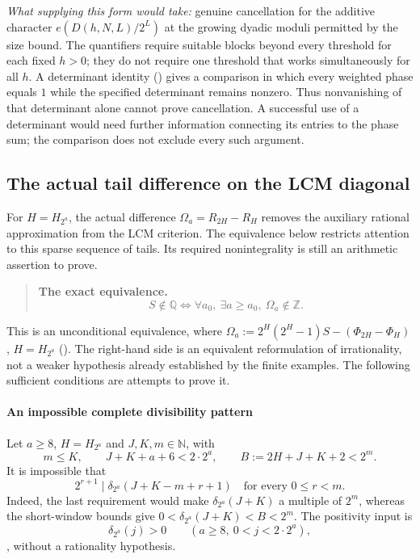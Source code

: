 \emph{What supplying this form would take:} genuine
cancellation for the additive character $e(D(h,N,L)/2^L)$ at the
growing dyadic moduli permitted by the size bound. The quantifiers require
suitable blocks beyond every threshold for each fixed $h>0$; they do not
require one threshold that works simultaneously for all $h$. A determinant
identity
()
gives a comparison in which every weighted phase equals $1$ while the
specified determinant remains nonzero. Thus nonvanishing of that determinant
alone cannot prove cancellation. A successful use of a determinant would
need further information connecting its entries to the phase sum; the
comparison does not exclude every such argument.

\subsection{The actual tail difference on the LCM diagonal}

For $H=H_{2^a}$, the actual difference
$\Omega_a=R_{2H}-R_H$ removes the auxiliary rational approximation
from the LCM criterion. The equivalence below restricts attention to
this sparse sequence of tails. Its required nonintegrality is still
an arithmetic assertion to prove.

\begin{quote}
\textbf{The exact equivalence.}
\[
  S\notin\mathbb Q
  \iff
  \forall a_0,\ \exists a\ge a_0,\ \Omega_a\notin\mathbb{Z}.
\]
\end{quote}
This is an unconditional equivalence, where
$\Omega_a := 2^H(2^H-1)S - (\Phi_{2H}-\Phi_H)$,
$H=H_{2^a}$
().
The right-hand side is an equivalent reformulation of irrationality,
not a weaker hypothesis already established by the finite examples.
The following sufficient conditions are attempts to prove it.


\paragraph{An impossible complete divisibility pattern}
Let $a\ge8$, $H=H_{2^a}$ and $J,K,m\in\mathbb N$, with
\[
 m\le K,\qquad J+K+a+6<2\cdot2^a,\qquad
 B:=2H+J+K+2<2^m.
\]
It is impossible that
\[
 2^{r+1}\mid\delta_{2^a}(J+K-m+r+1)
              \quad\text{for every }0\le r<m.
\]
Indeed, the last requirement would make $\delta_{2^a}(J+K)$ a
multiple of $2^m$, whereas the short-window bounds give
$0<\delta_{2^a}(J+K)<B<2^m$. The positivity input is
\[
 \delta_{2^a}(j)>0\qquad(a\ge8,\ 0<j<2\cdot2^a),
\]
, without a rationality hypothesis.

